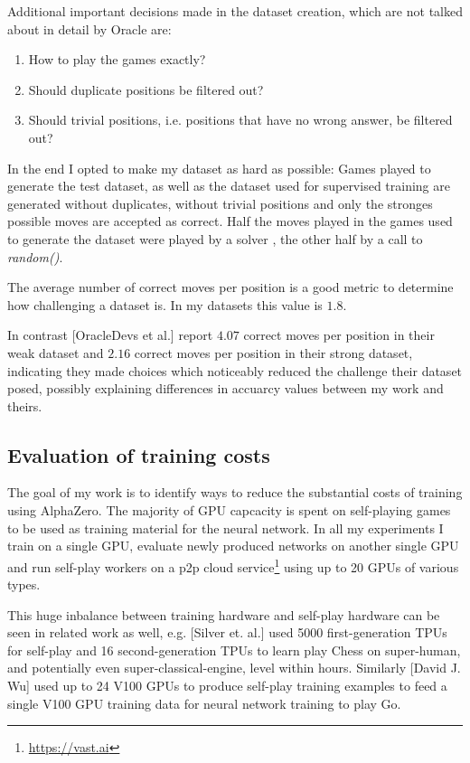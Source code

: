 \documentclass[12pt,onecolumn,oneside,titlepage]{article}
\begin{document}
Additional important decisions made in the dataset creation, which are not talked about in detail by Oracle are:

\begin{enumerate}
 \item How to play the games exactly?
 \item Should duplicate positions be filtered out?
 \item Should trivial positions, i.e. positions that have no wrong answer, be filtered out?
\end{enumerate}

In the end I opted to make my dataset as hard as possible: Games played to generate the test dataset, as well as the dataset used for supervised training are generated without duplicates, without trivial positions and only the stronges possible moves are accepted as correct.
Half the moves played in the games used to generate the dataset were played by a solver \cite{pascalsolver, pascalsolvergithub}, the other half by a call to \emph{random()}.

The average number of correct moves per position is a good metric to determine how challenging a dataset is. In my datasets this value is $1.8$.

In contrast \cite{oracledevs}[OracleDevs et al.] report $4.07$ correct moves per position in their weak dataset and $2.16$ correct moves per position in their strong dataset, indicating they made choices which noticeably reduced the challenge their dataset posed, 
possibly explaining differences in accuarcy values between my work and theirs.

\subsection{Evaluation of training costs}

The goal of my work is to identify ways to reduce the substantial costs of training using AlphaZero. The majority of GPU capcacity is spent on self-playing games to be used as training material for the neural network.
In all my experiments I train on a single GPU, evaluate newly produced networks on another single GPU and run self-play workers on a p2p cloud service\footnote{\url{https://vast.ai}} using up to 20 GPUs of various types.

This huge inbalance between training hardware and self-play hardware can be seen in related work as well, e.g. \cite{AlphaZero}[Silver et. al.] used 5000 first-generation TPUs for self-play and 16 second-generation TPUs 
to learn play Chess on super-human, and potentially even super-classical-engine, level within hours. Similarly \cite{wu2019accelerating}[David J. Wu] used up to 24 V100 GPUs to produce self-play training examples to feed a single V100 GPU training data for neural network training to play Go.
\end{document}
